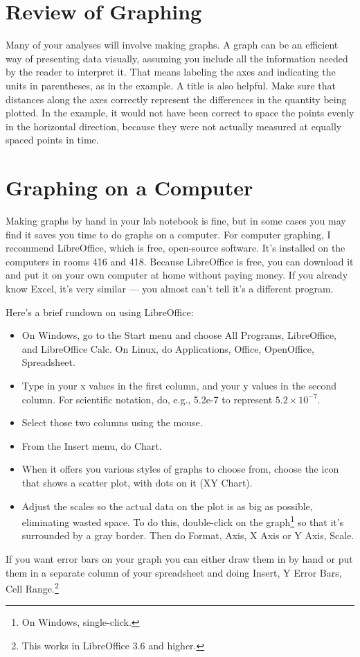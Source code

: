 
\section*{Review of Graphing}
Many of your analyses will involve making graphs. A graph
can be an efficient way of presenting data visually,
assuming you include all the information needed by the
reader to interpret it. That means labeling the axes and
indicating the units in parentheses, as in the example. A
title is also helpful. Make sure that distances along the
axes correctly represent the differences in the quantity
being plotted. In the example, it would not have been
correct to space the points evenly in the horizontal
direction, because they were not actually measured at
equally spaced points in time. 



\section*{Graphing on a Computer}
Making graphs by hand in your lab notebook is fine, but in
some cases you may find it saves you time to do graphs on a
computer. For computer graphing, I recommend LibreOffice, which
is free, open-source software. It's installed on the computers
in rooms 416 and 418. Because LibreOffice is free, you can download
it and put it on your own computer at home without paying money.
If you already know Excel, it's very similar --- you almost can't
tell it's a different program.

Here's a brief rundown on using LibreOffice:
\begin{itemize}
  \item[] On Windows, go to the Start menu and choose All Programs, LibreOffice, and LibreOffice Calc.
          On Linux, do Applications, Office, OpenOffice, Spreadsheet.
  \item[] Type in your x values in the first column, and your
  	y values in the second column. For scientific notation, do, e.g., 5.2e-7
        to represent $5.2\times10^{-7}$.
  \item[] Select those two columns using the mouse.
  \item[] From the Insert menu, do Chart.
  \item[] When it offers you various styles of graphs to choose from, choose
          the icon that shows a scatter plot, with dots on it  (XY Chart).
  \item[] Adjust the scales so the actual data on the plot is as big as possible,
          eliminating wasted space. To do this, double-click on the graph\footnote{On Windows, single-click.} so that it's
          surrounded by a gray border. Then do Format, Axis, X Axis or Y Axis, Scale.
\end{itemize}
If you want error bars on your graph you can either draw them in by hand or put them in a
separate column of your spreadsheet and doing Insert, Y Error Bars, Cell Range.\footnote{This works in
LibreOffice 3.6 and higher.}

